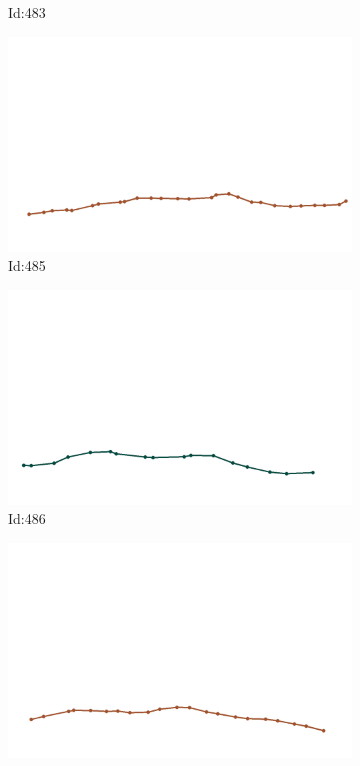 \documentclass[12pt,twoside]{report}
\begin{document}
\begin{figure}
\begin{subfigure}[b]{0.20\textwidth}
\caption{Id:483}
\end{subfigure}
\begin{subfigure}[b]{0.20\textwidth}
\centering
\includegraphics[width=\textwidth]{../trajectories/485.png}
\caption{Id:485}
\end{subfigure}
\begin{subfigure}[b]{0.20\textwidth}
\centering
\includegraphics[width=\textwidth]{../trajectories/486.png}
\caption{Id:486}
\end{subfigure}
\begin{subfigure}[b]{0.20\textwidth}
\centering
\includegraphics[width=\textwidth]{../trajectories/492.png}

\end{subfigure}
\end{figure}
\end{document}
